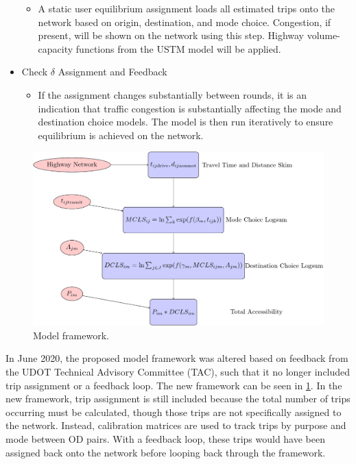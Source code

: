 \begin{itemize}
\begin{itemize}
			\item A static user equilibrium assignment loads all estimated trips
      onto the network based on origin, destination, and mode choice.
      Congestion, if present, will be shown on the network using this
      step. Highway volume-capacity functions from the USTM model will be
      applied.
		\end{itemize}
	\item Check $\delta$ Assignment and Feedback
		\begin{itemize}
			\item If the assignment changes substantially between rounds, it is
      an indication that traffic congestion is substantially affecting the
      mode and destination choice models. The model is then run
      iteratively to ensure equilibrium is achieved on the network.
		\end{itemize}
	\end{itemize}

  \begin{figure}

  {\centering \includegraphics[width=0.75\linewidth]{figures/chapter3/framework.png}

  }

  \caption{Model framework.}\label{fig:framework}
  \end{figure}

In June 2020, the proposed model framework was altered based on feedback from the UDOT Technical Advisory Committee (TAC), such that it no longer included trip assignment or a feedback loop. The new framework can be seen in \ref{fig:framework}. In the new framework, trip assignment is still included because the total number of trips occurring must be calculated, though those trips are not specifically assigned to the network. Instead, calibration matrices are used to track trips by purpose and mode between OD pairs. With a feedback loop, these trips would have been assigned back onto the network before looping back through the framework.

